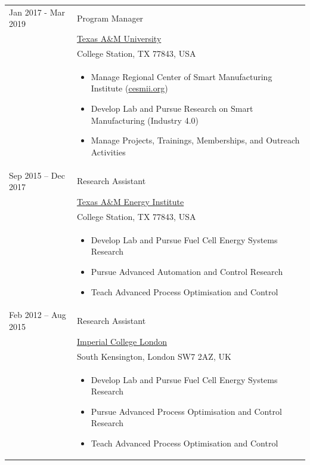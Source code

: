 \documentclass[11pt,a4paper]{article}
\begin{document}
\begin{tabular*}{\textwidth}[c]{@{}R{50mm}@{\hspace{6mm}}L{128mm}@{}}
    Jan 2017 - Mar 2019 & \Large{Program Manager}\\
    & \href{https://www.tamu.edu}{Texas A\&M University}\\
    & \footnotesize{College Station, TX 77843, USA}\\ &
    \begin{itemize}
        \item Manage Regional Center of Smart Manufacturing Institute (\href{https://www.cesmii.org}{cesmii.org})
        \item Develop Lab and Pursue Research on Smart Manufacturing (Industry 4.0)
        \item Manage Projects, Trainings, Memberships, and Outreach Activities
    \end{itemize}\\

    Sep 2015 -- Dec 2017 & \Large{Research Assistant}\\
    & \href{https://energy.tamu.edu}{Texas A\&M Energy Institute}\\
    & \footnotesize{College Station, TX 77843, USA}\\ &
    \begin{itemize}
        \item Develop Lab and Pursue Fuel Cell Energy Systems Research
        \item Pursue Advanced Automation and Control Research
        \item Teach Advanced Process Optimisation and Control
    \end{itemize}\\

    Feb 2012 -- Aug 2015 & \Large{Research Assistant}\\
    & \href{https://www.imperial.ac.uk}{Imperial College London}\\
    & \footnotesize{South Kensington, London SW7 2AZ, UK}\\ &
    \begin{itemize}
        \item Develop Lab and Pursue Fuel Cell Energy Systems Research
        \item Pursue Advanced Process Optimisation and Control Research
        \item Teach Advanced Process Optimisation and Control
    \end{itemize}\\


\end{tabular*}
\end{document}
